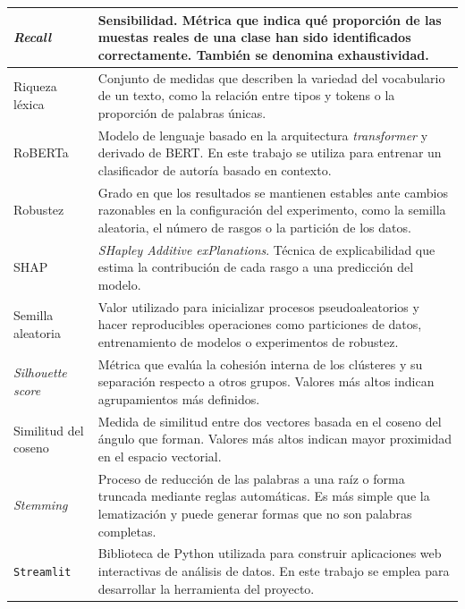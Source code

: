 \documentclass[IB]{TFUOC}%
\begin{document}
\begin{longtable}{|p{5.2cm}|p{10.5cm}|}
\textit{Recall} &
Sensibilidad. Métrica que indica qué proporción de las muestas reales de una clase han sido identificados correctamente. También se denomina exhaustividad. \\
\hline

Riqueza léxica &
Conjunto de medidas que describen la variedad del vocabulario de un texto, como la relación entre tipos y tokens o la proporción de palabras únicas. \\
\hline

RoBERTa &
Modelo de lenguaje basado en la arquitectura \textit{transformer} y derivado de BERT. En este trabajo se utiliza para entrenar un clasificador de autoría basado en contexto. \\
\hline

Robustez &
Grado en que los resultados se mantienen estables ante cambios razonables en la configuración del experimento, como la semilla aleatoria, el número de rasgos o la partición de los datos. \\
\hline

SHAP &
\textit{SHapley Additive exPlanations}. Técnica de explicabilidad que estima la contribución de cada rasgo a una predicción del modelo. \\
\hline

Semilla aleatoria &
Valor utilizado para inicializar procesos pseudoaleatorios y hacer reproducibles operaciones como particiones de datos, entrenamiento de modelos o experimentos de robustez. \\
\hline

\textit{Silhouette score} &
Métrica que evalúa la cohesión interna de los clústeres y su separación respecto a otros grupos. Valores más altos indican agrupamientos más definidos. \\
\hline

Similitud del coseno &
Medida de similitud entre dos vectores basada en el coseno del ángulo que forman. Valores más altos indican mayor proximidad en el espacio vectorial. \\
\hline

\textit{Stemming} &
Proceso de reducción de las palabras a una raíz o forma truncada mediante reglas automáticas. Es más simple que la lematización y puede generar formas que no son palabras completas. \\
\hline

\texttt{Streamlit} &
Biblioteca de Python utilizada para construir aplicaciones web interactivas de análisis de datos. En este trabajo se emplea para desarrollar la herramienta del proyecto. \\
\hline


\end{longtable}
\end{document}
